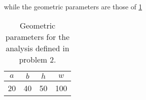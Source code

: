 \begin{enumerate}
while the geometric parameters are those of \cref{tab:tema1}

\begin{table}[H]
	\centering
	\begin{tabular}{cccc}
		\hline
		$a$ & $b$ & $h$ & $w$ \\
		\hline
		20      & 40      & 50      & 100  \\
		\hline
	\end{tabular}
	\caption{Geometric parameters for the analysis defined in problem 2.}
	\label{tab:tema1}
\end{table}








%
%
%

\end{enumerate}
